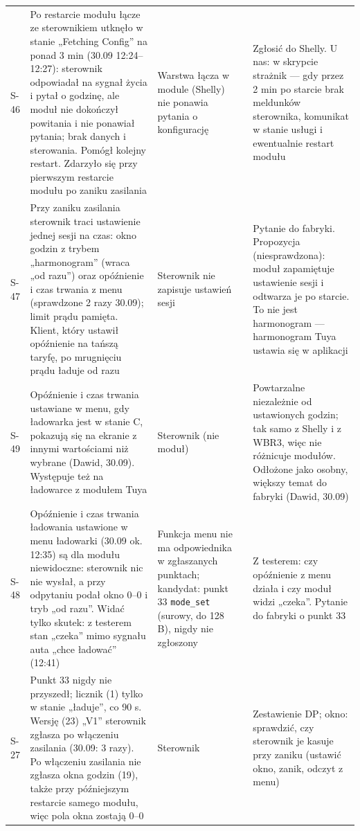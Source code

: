 \documentclass[11pt,a4paper]{article}
\begin{document}
\begin{longtable}{>{\raggedright\arraybackslash}p{3.00cm}>{\raggedright\arraybackslash}p{4.13cm}>{\raggedright\arraybackslash}p{2.33cm}>{\raggedright\arraybackslash}p{0.81cm}>{\raggedright\arraybackslash}p{4.13cm}}
S-46 & Po restarcie modułu łącze ze sterownikiem utknęło w stanie „Fetching Config” na ponad 3 min (30.09 12:24–12:27): sterownik odpowiadał na sygnał życia i pytał o godzinę, ale moduł nie dokończył powitania i nie ponawiał pytania; brak danych i sterowania. Pomógł kolejny restart. Zdarzyło się przy pierwszym restarcie modułu po zaniku zasilania & Warstwa łącza w module (Shelly) nie ponawia pytania o konfigurację & \leavevmode{\symbolfont\color{apred}\textbf{✘}} & Zgłosić do Shelly. U nas: w skrypcie strażnik — gdy przez 2 min po starcie brak meldunków sterownika, komunikat w stanie usługi i ewentualnie restart modułu \\
S-47 & Przy zaniku zasilania sterownik traci ustawienie jednej sesji na czas: okno godzin z trybem „harmonogram” (wraca „od razu”) oraz opóźnienie i czas trwania z menu (sprawdzone 2 razy 30.09); limit prądu pamięta. Klient, który ustawił opóźnienie na tańszą taryfę, po mrugnięciu prądu ładuje od razu & Sterownik nie zapisuje ustawień sesji & \leavevmode{\symbolfont\color{apred}\textbf{✘}} & Pytanie do fabryki. Propozycja (niesprawdzona): moduł zapamiętuje ustawienie sesji i odtwarza je po starcie. To nie jest harmonogram — harmonogram Tuya ustawia się w aplikacji \\
S-49 & Opóźnienie i czas trwania ustawiane w menu, gdy ładowarka jest w stanie C, pokazują się na ekranie z innymi wartościami niż wybrane (Dawid, 30.09). Występuje też na ładowarce z modułem Tuya & Sterownik (nie moduł) & \leavevmode{\symbolfont\color{apred}\textbf{✘}} & Powtarzalne niezależnie od ustawionych godzin; tak samo z Shelly i z WBR3, więc nie różnicuje modułów. Odłożone jako osobny, większy temat do fabryki (Dawid, 30.09) \\
S-48 & Opóźnienie i czas trwania ładowania ustawione w menu ładowarki (30.09 ok. 12:35) są dla modułu niewidoczne: sterownik nic nie wysłał, a przy odpytaniu podał okno 0–0 i tryb „od razu”. Widać tylko skutek: z testerem stan „czeka” mimo sygnału auta „chce ładować” (12:41) & Funkcja menu nie ma odpowiednika w zgłaszanych punktach; kandydat: punkt 33 \texttt{mode\_set} (surowy, do 128 B), nigdy nie zgłoszony & \leavevmode{\symbolfont\color{apred}\textbf{✘}} & Z testerem: czy opóźnienie z menu działa i czy moduł widzi „czeka”. Pytanie do fabryki o punkt 33 \\
S-27 & Punkt 33 nigdy nie przyszedł; licznik (1) tylko w stanie „ładuje”, co 90 s. Wersję (23) „V1” sterownik zgłasza po włączeniu zasilania (30.09: 3 razy). Po włączeniu zasilania nie zgłasza okna godzin (19), także przy późniejszym restarcie samego modułu, więc pola okna zostają 0–0 & Sterownik & \leavevmode{\symbolfont\color{apamber}\textbf{◐}} & Zestawienie DP; okno: sprawdzić, czy sterownik je kasuje przy zaniku (ustawić okno, zanik, odczyt z menu) \\

\end{longtable}
\end{document}

